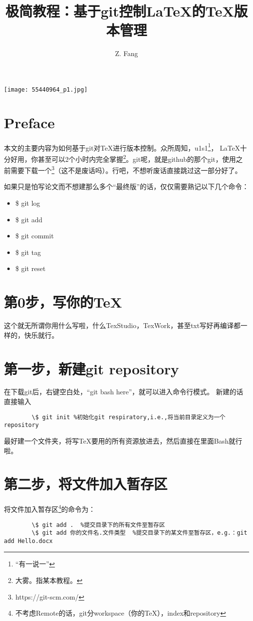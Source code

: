 \documentclass[cn,hazy,sakura,screen,14pt]{elegantnote}
\title{极简教程：基于git控制\LaTeX{}的\TeX{}版本管理}
\author{Z. Fang}
\institute{Chem. FDU}
\date{\zhtoday}
\begin{document}
	
	\maketitle
	
	\centerline{
		\texttt{[image: 55440964\_p1.jpg]}
	}
	
	
	\section{Preface}
	
	本文的主要内容为如何基于git对\TeX{}进行版本控制。众所周知，u1s1\footnote{“有一说一”}， \LaTeX{}十分好用，你甚至可以2个小时内完全掌握\footnote{大雾。指某本教程。}。git呢，就是github的那个git，使用之前需要下载一个\footnote{https://git-scm.com/}（这不是废话吗）。行吧，不想听废话直接跳过这一部分好了。
	
	如果只是怕写论文而不想建那么多个“最终版”的话，仅仅需要熟记以下几个命令：
	\begin{itemize}
		\item \$ git log
		\item \$ git add
		\item \$ git commit
		\item \$ git tag
		\item \$ git reset
	\end{itemize}
	
	
	\section{第0步，写你的\TeX{}}
	这个就无所谓你用什么写啦，什么TexStudio，TexWork，甚至txt写好再编译都一样的，快乐就行。

	\section{第一步，新建git repository}
	在下载git后，右键空白处，“git bash here”，就可以进入命令行模式。
	新建的话直接输入
	\begin{lstlisting}
		\$ git init %初始化git respiratory,i.e.,将当前目录定义为一个repository
	\end{lstlisting}	
	
	\begin{remark}
	最好建一个文件夹，将写\TeX{}要用的所有资源放进去，然后直接在里面Bash就行啦。
	\end{remark}
	
	
	\section{第二步，将文件加入暂存区}
	将文件加入暂存区\footnote{不考虑Remote的话，git分workspace（你的\TeX{}），index和repository}的命令为：
	\begin{lstlisting}
		\$ git add .  %提交目录下的所有文件至暂存区
		\$ git add 你的文件名.文件类型  %提交目录下的某文件至暂存区，e.g.：git add Hello.docx	
	\end{lstlisting}
\end{document}
